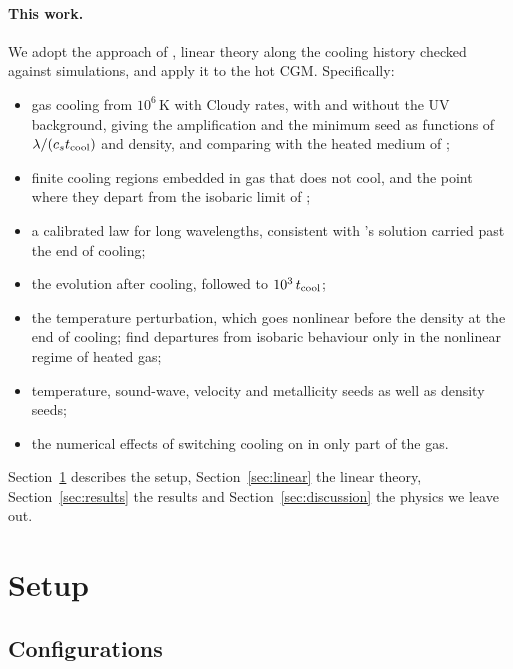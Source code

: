 \documentclass[11pt]{article}
\newcommand{\tcool}{t_{\rm cool}}
\newcommand{\cstc}{c_s t_{\rm cool}}
\begin{document}
\paragraph{This work.} We adopt the approach of \citet{schwarz72}, linear theory along
the cooling history checked against simulations, and apply it to the hot CGM.
Specifically:
\begin{itemize}
\item gas cooling from $10^6$\,K with Cloudy rates, with and without the UV
  background, giving the amplification and the minimum seed as functions of
  $\lambda/(\cstc)$ and density, and comparing with the heated medium of \citet{das21};
\item finite cooling regions embedded in gas that does not cool, and the point
  where they depart from the isobaric limit of \citet{mathews78};
\item a calibrated law for long wavelengths, consistent with \citet{burkert00}'s
  solution carried past the end of cooling;
\item the evolution after cooling, followed to $10^3\,\tcool$;
\item the temperature perturbation, which goes nonlinear before the density at the end
  of cooling; \citet{waters19} find departures from isobaric behaviour only in the
  nonlinear regime of heated gas;
\item temperature, sound-wave, velocity and metallicity seeds as well as density
  seeds;
\item the numerical effects of switching cooling on in only part of the gas.
\end{itemize}
Section~\ref{sec:setup} describes the setup, Section~\ref{sec:linear} the linear
theory, Section~\ref{sec:results} the results and Section~\ref{sec:discussion} the
physics we leave out.

\section{Setup}
\label{sec:setup}

\subsection{Configurations}
\end{document}
